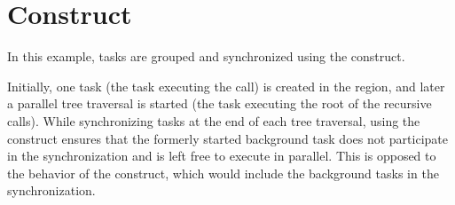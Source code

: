 \pagebreak
\section{ Construct}
\label{sec:taskgroup}

In this example, tasks are grouped and synchronized using the  
construct.

Initially, one task (the task executing the  
call) is created in the  region, and later a parallel tree traversal 
is started (the task executing the root of the recursive  
calls). While synchronizing tasks at the end of each tree traversal, using the 
 construct ensures that the formerly started background task 
does not participate in the synchronization and is left free to execute in parallel. 
This is opposed to the behavior of the  construct, which would 
include the background tasks in the synchronization.



